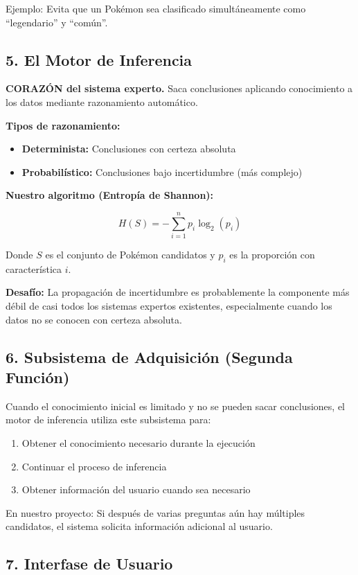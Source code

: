 \documentclass[12pt,a4paper]{article}
\begin{document}
Ejemplo: Evita que un Pokémon sea clasificado simultáneamente como ``legendario'' y ``común''.

\subsection{5. El Motor de Inferencia}

\textbf{CORAZÓN del sistema experto.} Saca conclusiones aplicando conocimiento a los datos mediante razonamiento automático.

\textbf{Tipos de razonamiento:}
\begin{itemize}
    \item \textbf{Determinista:} Conclusiones con certeza absoluta
    \item \textbf{Probabilístico:} Conclusiones bajo incertidumbre (más complejo)
\end{itemize}

\textbf{Nuestro algoritmo (Entropía de Shannon):}

$$H(S) = -\sum_{i=1}^{n} p_i \log_2(p_i)$$

Donde $S$ es el conjunto de Pokémon candidatos y $p_i$ es la proporción con característica $i$.

\textbf{Desafío:} La propagación de incertidumbre es probablemente la componente más débil de casi todos los sistemas expertos existentes, especialmente cuando los datos no se conocen con certeza absoluta.

\subsection{6. Subsistema de Adquisición (Segunda Función)}

Cuando el conocimiento inicial es limitado y no se pueden sacar conclusiones, el motor de inferencia utiliza este subsistema para:

\begin{enumerate}
    \item Obtener el conocimiento necesario durante la ejecución
    \item Continuar el proceso de inferencia
    \item Obtener información del usuario cuando sea necesario
\end{enumerate}

En nuestro proyecto: Si después de varias preguntas aún hay múltiples candidatos, el sistema solicita información adicional al usuario.

\subsection{7. Interfase de Usuario}
\end{document}

